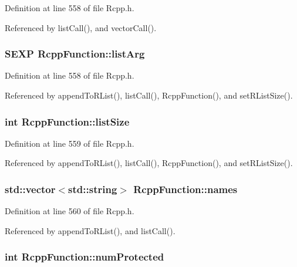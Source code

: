 Definition at line 558 of file Rcpp.h.

Referenced by listCall(), and vectorCall().\hypertarget{classRcppFunction_a3b8a2c8441c9791f9fe5bd5273bbceec}{
\subsubsection[{listArg}]{\setlength{\rightskip}{0pt plus 5cm}SEXP {\bf RcppFunction::listArg}}}
\label{classRcppFunction_a3b8a2c8441c9791f9fe5bd5273bbceec}


Definition at line 558 of file Rcpp.h.

Referenced by appendToRList(), listCall(), RcppFunction(), and setRListSize().\hypertarget{classRcppFunction_ac3a42478ffd123f430ba3e09099db6f8}{
\subsubsection[{listSize}]{\setlength{\rightskip}{0pt plus 5cm}int {\bf RcppFunction::listSize}}}
\label{classRcppFunction_ac3a42478ffd123f430ba3e09099db6f8}


Definition at line 559 of file Rcpp.h.

Referenced by appendToRList(), listCall(), RcppFunction(), and setRListSize().\hypertarget{classRcppFunction_abf9e86df5e1a290a5f321e6051f0d2b2}{
\subsubsection[{names}]{\setlength{\rightskip}{0pt plus 5cm}std::vector$<$std::string$>$ {\bf RcppFunction::names}}}
\label{classRcppFunction_abf9e86df5e1a290a5f321e6051f0d2b2}


Definition at line 560 of file Rcpp.h.

Referenced by appendToRList(), and listCall().\hypertarget{classRcppFunction_adc777e7d1628ccc4f531a8375f30f385}{
\subsubsection[{numProtected}]{\setlength{\rightskip}{0pt plus 5cm}int {\bf RcppFunction::numProtected}}}
\label{classRcppFunction_adc777e7d1628ccc4f531a8375f30f385}


